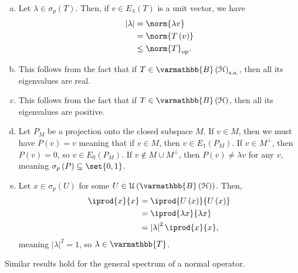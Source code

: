 \documentclass[10pt]{mypackage}
\renewcommand*{\mathbb}[1]{\varmathbb{#1}}
\newcommand{\sa}{\text{s.a.}}
\newcommand{\B}{\mathbb{B}}
\begin{document}
\begin{solution}\hfill
  \begin{enumerate}[(a)]
    \item Let $\lambda\in \sigma_p\left(T\right)$. Then, if $v\in E_{\lambda}\left(T\right)$ is a unit vector, we have
      \begin{align*}
        \left\vert \lambda \right\vert &= \norm{\lambda v}\\
                                       &= \norm{T\left(v\right)}\\
                                       &\leq \norm{T}_{\text{op}}.
      \end{align*}
    \item This follows from the fact that if $T\in \B\left(\mathcal{H}\right)_{\sa}$, then all its eigenvalues are real.
    \item This follows from the fact that if $T\in \B\left(\mathcal{H}\right)$, then all its eigenvalues are positive.
    \item Let $P_M$ be a projection onto the closed subspace $M$. If $v\in M$, then we must have $P\left(v\right) = v$ meaning that if $v\in M$, then $v\in E_{1}\left(P_M\right)$. If $v\in M^{\perp}$, then $P\left(v\right) = 0$, so $v\in E_{0}\left(P_M\right)$. If $v\notin M\cup M^{\perp}$, then $P\left(v\right) \neq \lambda v$ for any $v$, meaning $\sigma_p\left(P\right) \subseteq \set{0,1}$.
    \item Let $x\in \sigma_p\left(U\right)$ for some $U\in \mathcal{U}\left(\B\left(\mathcal{H}\right)\right)$. Then,
      \begin{align*}
        \iprod{x}{x} &= \iprod{U\left(x\right)}{U\left(x\right)}\\
                     &= \iprod{\lambda x}{\lambda x}\\
                     &= \left\vert \lambda \right\vert^2 \iprod{x}{x},
      \end{align*}
      meaning $\left\vert \lambda \right\vert^2 = 1$, so $\lambda \in \mathbb{T}$.
  \end{enumerate}
\end{solution}
Similar results hold for the general spectrum of a normal operator.\newline
\end{document}
